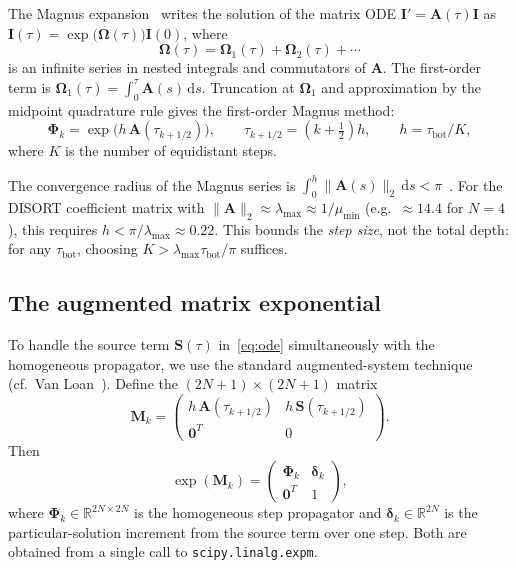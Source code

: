 \documentclass[11pt,a4paper]{article}
\newcommand{\R}{\mathbb{R}}
\newcommand{\vect}[1]{\bm{#1}}
\newcommand{\mat}[1]{\mathbf{#1}}
\newcommand{\tbot}{\tau_{\mathrm{bot}}}
\newcommand{\dd}{\,\mathrm{d}}
\theoremstyle{definition}
\begin{document}
The Magnus expansion~\cite{magnus1954} writes the solution of the
matrix ODE $\vect{I}'=\mat{A}(\tau)\vect{I}$ as
$\vect{I}(\tau)=\exp\bigl(\mat{\Omega}(\tau)\bigr)\vect{I}(0)$, where
\begin{equation}
  \mat{\Omega}(\tau) = \mat{\Omega}_1(\tau)
  + \mat{\Omega}_2(\tau) + \cdots
\end{equation}
is an infinite series in nested integrals and commutators of $\mat{A}$.
The first-order term is $\mat{\Omega}_1(\tau)=\int_0^\tau\mat{A}(s)\dd s$.
Truncation at $\mat{\Omega}_1$ and approximation by the midpoint
quadrature rule gives the first-order Magnus method:
\begin{equation}\label{eq:magnus_step}
  \mat{\Phi}_k = \exp\!\bigl(h\,\mat{A}(\tau_{k+1/2})\bigr),
  \qquad \tau_{k+1/2}=(k+\tfrac{1}{2})h,
  \qquad h=\tbot/K,
\end{equation}
where $K$ is the number of equidistant steps.

The convergence radius of the Magnus series is
$\int_0^h\|\mat{A}(s)\|_2\dd s < \pi$~\cite{blanes2009,moan2008}.
For the DISORT coefficient matrix with
$\|\mat{A}\|_2\approx\lambda_{\max}\approx 1/\mu_{\min}$
(e.g.\ $\approx\!14.4$ for $N\!=\!4$), this requires
$h < \pi/\lambda_{\max}\approx 0.22$.  This bounds the
\emph{step size}, not the total depth: for any $\tbot$, choosing
$K > \lambda_{\max}\tbot/\pi$ suffices.

\subsection{The augmented matrix exponential}\label{sec:augmented}

To handle the source term $\vect{S}(\tau)$ in~\eqref{eq:ode}
simultaneously with the homogeneous propagator, we use the standard
augmented-system technique (cf.\ Van Loan~\cite{vanloan1978}).
Define the $(2N\!+\!1)\!\times\!(2N\!+\!1)$ matrix
\begin{equation}\label{eq:augmented}
  \mat{M}_k = \begin{pmatrix}
    h\,\mat{A}(\tau_{k+1/2}) & h\,\vect{S}(\tau_{k+1/2}) \\
    \vect{0}^T & 0
  \end{pmatrix}.
\end{equation}
Then
\begin{equation}\label{eq:augmented_expm}
  \exp(\mat{M}_k) = \begin{pmatrix}
    \mat{\Phi}_k & \vect{\delta}_k \\
    \vect{0}^T   & 1
  \end{pmatrix},
\end{equation}
where $\mat{\Phi}_k\in\R^{2N\times 2N}$ is the homogeneous step
propagator and $\vect{\delta}_k\in\R^{2N}$ is the particular-solution
increment from the source term over one step.  Both are obtained from
a single call to \texttt{scipy.linalg.expm}.
\end{document}
